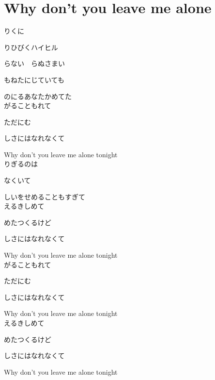 \section{ Why don't you leave me alone}
\large{

りくに

りひびくハイヒル

らない　らぬさまい

もねたにじていても

のにるあなたかめてた
\\

がることもれて

ただにむ

しさにはなれなくて

Why don't you leave me alone tonight
\\

りぎるのは

なくいて

しいをせめることもすぎて
\\

えるきしめて

めたつくるけど

しさにはなれなくて

Why don't you leave me alone tonight
\\

がることもれて

ただにむ

しさにはなれなくて

Why don't you leave me alone tonight
\\

えるきしめて

めたつくるけど

しさにはなれなくて

Why don't you leave me alone tonight

}